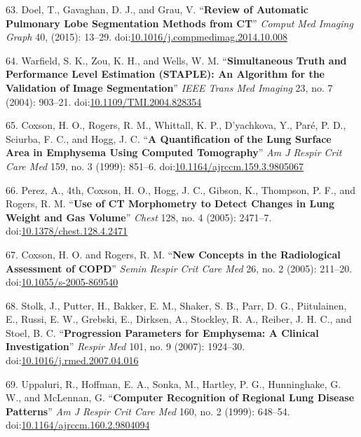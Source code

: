 \documentclass[11pt,]{article}
\begin{document}
\hypertarget{ref-Doel:2015aa}{}
63. Doel, T., Gavaghan, D. J., and Grau, V. ``\textbf{Review of
Automatic Pulmonary Lobe Segmentation Methods from CT}'' \emph{Comput
Med Imaging Graph} 40, (2015): 13--29.
doi:\href{https://doi.org/10.1016/j.compmedimag.2014.10.008}{10.1016/j.compmedimag.2014.10.008}

\hypertarget{ref-Warfield:2004aa}{}
64. Warfield, S. K., Zou, K. H., and Wells, W. M. ``\textbf{Simultaneous
Truth and Performance Level Estimation (STAPLE): An Algorithm for the
Validation of Image Segmentation}'' \emph{IEEE Trans Med Imaging} 23,
no. 7 (2004): 903--21.
doi:\href{https://doi.org/10.1109/TMI.2004.828354}{10.1109/TMI.2004.828354}

\hypertarget{ref-Coxson:1999aa}{}
65. Coxson, H. O., Rogers, R. M., Whittall, K. P., D'yachkova, Y., Paré,
P. D., Sciurba, F. C., and Hogg, J. C. ``\textbf{A Quantification of the
Lung Surface Area in Emphysema Using Computed Tomography}'' \emph{Am J
Respir Crit Care Med} 159, no. 3 (1999): 851--6.
doi:\href{https://doi.org/10.1164/ajrccm.159.3.9805067}{10.1164/ajrccm.159.3.9805067}

\hypertarget{ref-Perez:2005aa}{}
66. Perez, A., 4th, Coxson, H. O., Hogg, J. C., Gibson, K., Thompson, P.
F., and Rogers, R. M. ``\textbf{Use of CT Morphometry to Detect Changes
in Lung Weight and Gas Volume}'' \emph{Chest} 128, no. 4 (2005):
2471--7.
doi:\href{https://doi.org/10.1378/chest.128.4.2471}{10.1378/chest.128.4.2471}

\hypertarget{ref-Coxson:2005aa}{}
67. Coxson, H. O. and Rogers, R. M. ``\textbf{New Concepts in the
Radiological Assessment of COPD}'' \emph{Semin Respir Crit Care Med} 26,
no. 2 (2005): 211--20.
doi:\href{https://doi.org/10.1055/s-2005-869540}{10.1055/s-2005-869540}

\hypertarget{ref-Stolk:2007aa}{}
68. Stolk, J., Putter, H., Bakker, E. M., Shaker, S. B., Parr, D. G.,
Piitulainen, E., Russi, E. W., Grebski, E., Dirksen, A., Stockley, R.
A., Reiber, J. H. C., and Stoel, B. C. ``\textbf{Progression Parameters
for Emphysema: A Clinical Investigation}'' \emph{Respir Med} 101, no. 9
(2007): 1924--30.
doi:\href{https://doi.org/10.1016/j.rmed.2007.04.016}{10.1016/j.rmed.2007.04.016}

\hypertarget{ref-Uppaluri:1999aa}{}
69. Uppaluri, R., Hoffman, E. A., Sonka, M., Hartley, P. G.,
Hunninghake, G. W., and McLennan, G. ``\textbf{Computer Recognition of
Regional Lung Disease Patterns}'' \emph{Am J Respir Crit Care Med} 160,
no. 2 (1999): 648--54.
doi:\href{https://doi.org/10.1164/ajrccm.160.2.9804094}{10.1164/ajrccm.160.2.9804094}
\end{document}

